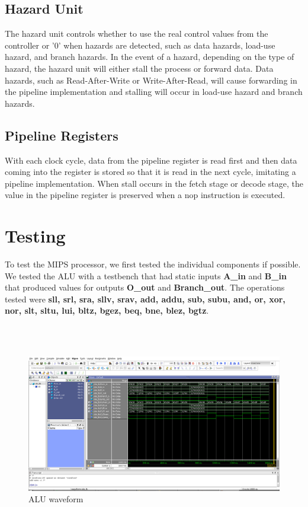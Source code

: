 \documentclass{article}
\begin{document}
	\subsection{Hazard Unit}
	The hazard unit controls whether to use the real control values from the controller or '0' when hazards are detected, such as data hazards, load-use hazard, and branch hazards. In the event of a hazard, depending on the type of hazard, the hazard unit will either stall the process or forward data. Data hazards, such as Read-After-Write or Write-After-Read, will cause forwarding in the pipeline implementation and stalling will occur in load-use hazard and branch hazards.
		
	\subsection{Pipeline Registers}
	With each clock cycle, data from the pipeline register is read first and then data coming into the register is stored so that it is read in the next cycle, imitating a pipeline implementation. When stall occurs in the fetch stage or decode stage, the value in the pipeline register is preserved when a nop instruction is executed. 
		
\section{Testing}
	To test the MIPS processor, we first tested the individual components if possible. We tested the ALU with a testbench that had static inputs \textbf{A\_in} and \textbf{B\_in} that produced values for outputs \textbf{O\_out} and \textbf{Branch\_out}. The operations tested were \textbf{sll, srl, sra, sllv, srav, add, addu, sub, subu, and, or,  xor, nor, slt, sltu, lui, bltz, bgez, beq, bne, blez, bgtz}. 

\\ \\
\begin{figure}[!ht]
	\centering
		\includegraphics[width=1\textwidth]{ALU_waveform.png}
		\caption{ALU waveform}
\end{figure}
\\ \\
\end{document}
